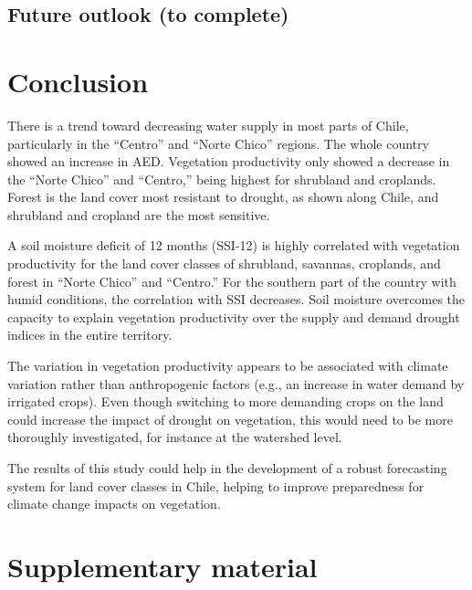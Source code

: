 \documentclass[
  authoryear,
  preprint,
  3p,
  onecolumn]{elsarticle}
\begin{document}
\hypertarget{future-outlook-to-complete}{%
\subsection{Future outlook (to
complete)}\label{future-outlook-to-complete}}

\hypertarget{conclusion}{%
\section{Conclusion}\label{conclusion}}

There is a trend toward decreasing water supply in most parts of Chile,
particularly in the ``Centro'' and ``Norte Chico'' regions. The whole
country showed an increase in AED. Vegetation productivity only showed a
decrease in the ``Norte Chico'' and ``Centro,'' being highest for
shrubland and croplands. Forest is the land cover most resistant to
drought, as shown along Chile, and shrubland and cropland are the most
sensitive.

A soil moisture deficit of 12 months (SSI-12) is highly correlated with
vegetation productivity for the land cover classes of shrubland,
savannas, croplands, and forest in ``Norte Chico'' and ``Centro.'' For
the southern part of the country with humid conditions, the correlation
with SSI decreases. Soil moisture overcomes the capacity to explain
vegetation productivity over the supply and demand drought indices in
the entire territory.

The variation in vegetation productivity appears to be associated with
climate variation rather than anthropogenic factors (e.g., an increase
in water demand by irrigated crops). Even though switching to more
demanding crops on the land could increase the impact of drought on
vegetation, this would need to be more thoroughly investigated, for
instance at the watershed level.

The results of this study could help in the development of a robust
forecasting system for land cover classes in Chile, helping to improve
preparedness for climate change impacts on vegetation.

\hypertarget{supplementary-material}{%
\section*{Supplementary material}\label{supplementary-material}}


\renewcommand\refname{References}
  
\end{document}
